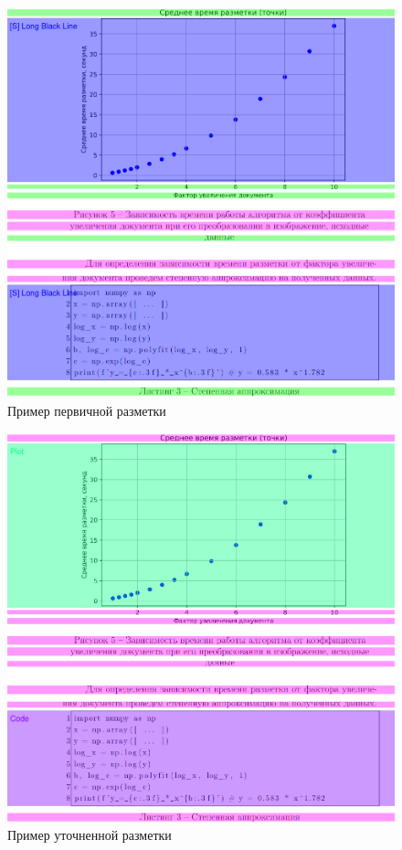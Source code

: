 \begin{figure}[H]
	\centering
	\includegraphics[width=\textwidth]{img/m.prim.png}
    \caption{Пример первичной разметки}
	\label{fig:prim}
\end{figure}

\begin{figure}[H]
	\centering
	\includegraphics[width=\textwidth]{img/m.spec.png}
    \caption{Пример уточненной разметки}
	\label{fig:spec}
\end{figure}

